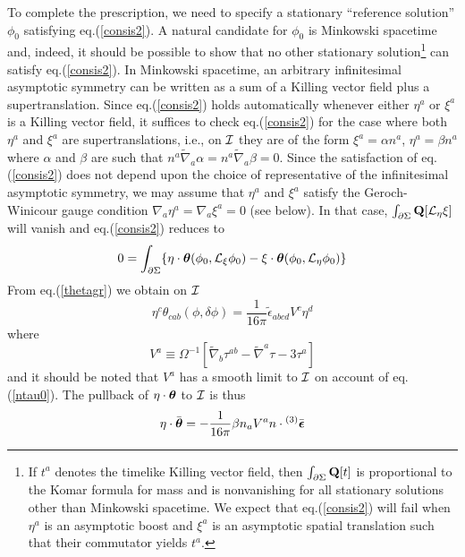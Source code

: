To complete the prescription, we need to specify a stationary
``reference solution'' $\phi_0$ satisfying eq.(\ref{consis2}). A
natural candidate for $\phi_0$ is Minkowski spacetime and, indeed, it
should be possible to show that no other stationary
solution\footnote{If $t^a$ denotes the timelike Killing vector field,
then $\int_{\partial \Sigma} {\bf Q}[t]$ is proportional to the Komar
formula for mass and is nonvanishing for all stationary solutions
other than Minkowski spacetime. We expect that eq.(\ref{consis2}) will
fail when $\eta^a$ is an asymptotic boost and $\xi^a$ is an asymptotic
spatial translation such that their commutator yields $t^a$.} can
satisfy eq.(\ref{consis2}). In Minkowski spacetime, an arbitrary
infinitesimal asymptotic symmetry can be written as a sum of a Killing
vector field plus a supertranslation. Since eq.(\ref{consis2}) holds
automatically whenever either $\eta^a$ or $\xi^a$ is a Killing vector
field, it suffices to check eq.(\ref{consis2}) for the case where both
$\eta^a$ and $\xi^a$ are supertranslations, i.e., on $\cal I$ they are
of the form $\xi^a = \alpha n^a$, $\eta^a = \beta n^a$ where $\alpha$
and $\beta$ are such that $n^a \tilde{\nabla}_a \alpha = n^a
\tilde{\nabla}_a \beta = 0$. Since the satisfaction of
eq.(\ref{consis2}) does not depend upon the choice of representative
of the infinitesimal asymptotic symmetry, we may assume that $\eta^a$
and $\xi^a$ satisfy the Geroch-Winicour gauge condition \cite{gw}
$\nabla_a \eta^a = \nabla_a \xi^a = 0$ (see below). In that case,
$\int_{\partial \Sigma} {\bf Q}[{\cal L}_\eta \xi]$ will vanish and
eq.(\ref{consis2}) reduces to
\begin{equation}
0 = \int_{\partial \Sigma} \{ \eta \cdot {\mbox{\boldmath
$\theta$}}(\phi_0,{\cal L}_\xi \phi_0) - \xi \cdot {\mbox{\boldmath
$\theta$}}(\phi_0,{\cal L}_\eta \phi_0) \}
\label{consis3}
\end{equation}
From eq.(\ref{thetagr}) we obtain on $\cal I$
\begin{equation}
\eta^c \theta_{cab}(\phi, \delta \phi) = \frac{1}{16 \pi}
\tilde{\epsilon}_{abcd} V^c \eta^d
\label{thetab}
\end{equation}
where
\begin{equation}
V^a \equiv \Omega^{-1} [\tilde{\nabla}_b \tau^{ab} - \tilde{\nabla}^a
\tau - 3 \tau^a]
\label{V2}
\end{equation}
and it should be noted that $V^a$ has a smooth limit to $\cal I$ on
account of eq.(\ref{ntau0}). The pullback of $\eta \cdot
{\mbox{\boldmath $\theta$}}$ to $\cal I$ is thus
\begin{equation}
\eta \cdot \bar{\mbox{\boldmath $\theta$}} = - \frac{1}{16 \pi} \beta
n_a V^a n \cdot {}^{(3)} \bar{\mbox{\boldmath $\epsilon$}}
\label{ptheta}
\end{equation}
